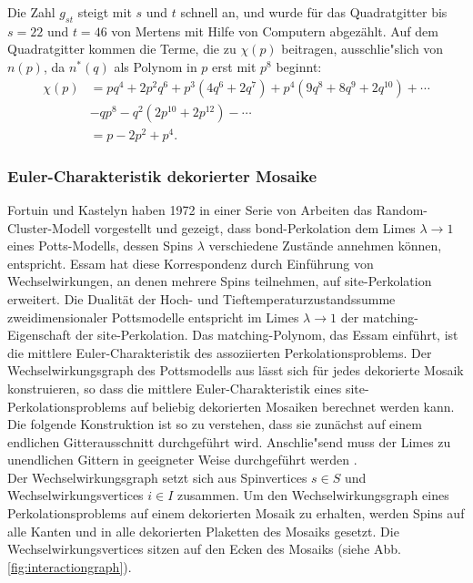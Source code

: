 Die Zahl $g_{st}$ steigt mit $s$ und $t$ schnell an, und wurde f\"ur das Quadratgitter bis $s = 22$ und $t=46$ von Mertens \cite{Mertens:90} mit Hilfe von Computern abgez\"ahlt. 
Auf dem Quadratgitter kommen die Terme, die zu $\chi(p)$ beitragen, ausschlie"slich von $n(p)$, da $n^*(q)$ als Polynom in $p$ erst mit $p^8$ beginnt:
\begin{equation}
  \begin{split}
  \chi(p)&=pq^4+2p^2q^6+p^3(4q^6+2q^7)+p^4(9q^8+8q^9+2q^{10})+\cdots\\
&-qp^8-q^2(2p^{10}+2p^{12})-\cdots\\
 &=p-2p^2+p^4.
  \end{split}
\end{equation}


\subsubsection{Euler-Charakteristik dekorierter Mosaike}
\label{sec:matchingpoly}
Fortuin und Kastelyn haben 1972 in einer Serie von Arbeiten \cite{Fortuin:72} das Random-Cluster-Modell vorgestellt und gezeigt, dass bond-Perkolation dem Limes $\lambda \rightarrow 1$ eines Potts-Modells, dessen Spins $\lambda$ verschiedene Zust\"ande annehmen k\"onnen, entspricht. Essam \cite{Essam:79} hat diese Korrespondenz durch Einf\"uhrung von Wechselwirkungen, an denen mehrere Spins teilnehmen, auf site-Perkolation erweitert. Die Dualit\"at der Hoch- und Tieftemperaturzustandssumme zweidimensionaler Pottsmodelle entspricht im Limes $\lambda \rightarrow 1$ der matching-Eigenschaft der site-Perkolation. Das matching-Polynom, das Essam einf\"uhrt, ist die mittlere Euler-Charakteristik des assoziierten Perkolationsproblems. Der Wechselwirkungsgraph des Pottsmodells aus \cite{Essam:79} l\"asst sich f\"ur jedes dekorierte Mosaik konstruieren, so dass die mittlere Euler-Charakteristik eines site-Perkolationsproblems auf beliebig dekorierten Mosaiken berechnet werden kann. Die folgende Konstruktion ist so zu verstehen, dass sie zun\"achst auf einem endlichen Gitterausschnitt durchgef\"uhrt wird. Anschlie"send muss der Limes zu unendlichen Gittern in geeigneter Weise durchgef\"uhrt werden \cite{Essam:79}. \\
Der Wechselwirkungsgraph setzt sich aus Spinvertices $s\in S$ und Wechselwirkungsvertices $i\in I$ zusammen. Um den Wechselwirkungsgraph eines Perkolationsproblems auf einem dekorierten Mosaik zu erhalten, werden Spins auf alle Kanten und in alle dekorierten Plaketten des Mosaiks gesetzt. Die Wechselwirkungsvertices sitzen auf den Ecken des Mosaiks (siehe Abb. \ref{fig:interactiongraph}).
